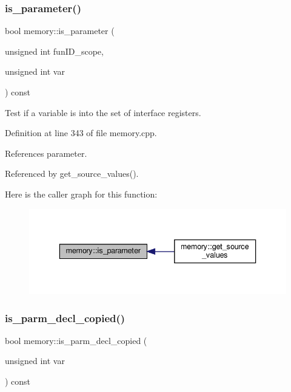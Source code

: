 \subsubsection{\texorpdfstring{is\+\_\+parameter()}{is\_parameter()}}
{\footnotesize\ttfamily bool memory\+::is\+\_\+parameter (\begin{DoxyParamCaption}\item[{unsigned int}]{fun\+I\+D\+\_\+scope,  }\item[{unsigned int}]{var }\end{DoxyParamCaption}) const}



Test if a variable is into the set of interface registers. 



Definition at line 343 of file memory.\+cpp.



References parameter.



Referenced by get\+\_\+source\+\_\+values().

Here is the caller graph for this function\+:
\nopagebreak
\begin{figure}[H]
\begin{center}
\leavevmode
\includegraphics[width=336pt]{d8/d99/classmemory_ab5e7b68f10177f4a17cfab6d711dab49_icgraph}
\end{center}
\end{figure}
\mbox{\label{classmemory_ae761b88fcafd4a0c6c7ae4426fe6ceb6}} 
\subsubsection{\texorpdfstring{is\+\_\+parm\+\_\+decl\+\_\+copied()}{is\_parm\_decl\_copied()}}
{\footnotesize\ttfamily bool memory\+::is\+\_\+parm\+\_\+decl\+\_\+copied (\begin{DoxyParamCaption}\item[{unsigned int}]{var }\end{DoxyParamCaption}) const}




